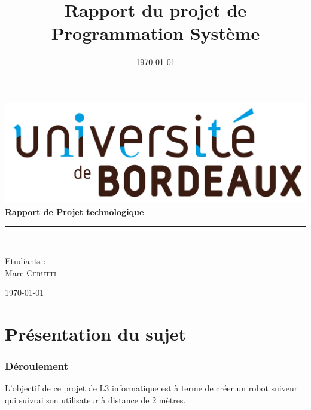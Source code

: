 \documentclass{article}
\title{Rapport du projet de Programmation Système}
\date{\today}
\begin{document}
\begin{titlepage}
 \begin{sffamily}
  \begin{center}
            \includegraphics[scale=0.04]{img/ubx-logo.png}
            \\[2cm]
        
    
    {\huge \bfseries Rapport de Projet technologique\\[0.5cm] }

    \rule{\linewidth}{.5pt}
    \\[2cm]

    \begin{minipage}{0.4\textwidth}
      \begin{flushleft} \large
        \author{}Etudiants :\\
        	Marc \textsc{Cerutti}\\
      \end{flushleft}
    \end{minipage}

    \vfill

    {\large \today}

  \end{center}
  \end{sffamily}
  
\end{titlepage}

\newpage

\tableofcontents

\newpage
\part{Présentation du sujet}

\section{Déroulement}
	L'objectif de ce projet de L3 informatique est à terme de créer un robot suiveur qui suivrai son utilisateur à distance de 2 mètres.\\
\end{document}
